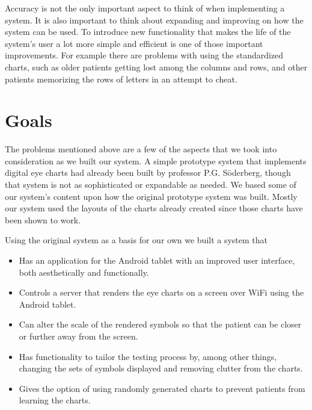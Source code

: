 \documentclass[12pt,a4paper,notitlepage]{report}
\begin{document}
Accuracy is not the only important aspect to think of when implementing a system. It is also important to think about expanding and improving on how the system can be used. To introduce new functionality that makes the life of the system's user a lot more simple and efficient is one of those important improvements. For example there are problems with using the standardized charts, such as older patients getting lost among the columns and rows, and other patients memorizing the rows of letters in an attempt to cheat. %

\section{ Goals}
The problems mentioned above are a few of the aspects that we took into consideration as we built our system. A simple prototype system that implements digital eye charts had already been built by professor P.G. Söderberg, though that system is not as sophisticated or expandable as needed. We based some of our system's content upon how the original prototype system was built. Mostly our system used the layouts of the charts already created since those charts have been shown to work. 

Using the original system as a basis for our own we built a system that

\begin{itemize}
	\item Has an application for the Android tablet with an improved user interface, both aesthetically and functionally.
	\item Controls a server that renders the eye charts on a screen over WiFi using the Android tablet.
	\item Can alter the scale of the rendered symbols so that the patient can be closer or further away from the screen.
	\item Has functionality to tailor the testing process by, among other things, changing the sets of symbols displayed and removing clutter from the charts.
	\item Gives the option of using randomly generated charts to prevent patients from learning the charts.
\end{itemize}

\end{document}
